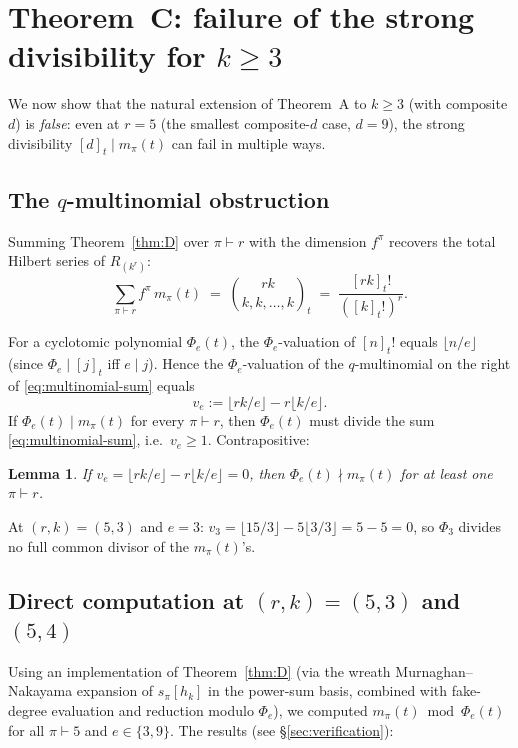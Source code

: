\documentclass[11pt]{article}
\newtheorem{lemma}[theorem]{Lemma}
\theoremstyle{plain}
\theoremstyle{definition}
\theoremstyle{remark}
\begin{document}
\section{Theorem~C: failure of the strong divisibility for $k \ge 3$}

We now show that the natural extension of Theorem~A to $k \ge 3$ (with
composite $d$) is \emph{false}: even at $r = 5$ (the smallest composite-$d$
case, $d = 9$), the strong divisibility $[d]_t \mid m_\pi(t)$ can fail in
multiple ways.

\subsection{The $q$-multinomial obstruction}

Summing Theorem~\ref{thm:D} over $\pi \vdash r$ with the dimension
$f^\pi$ recovers the total Hilbert series of $R_{(k^r)}$:
\begin{equation}\label{eq:multinomial-sum}
\sum_{\pi \vdash r} f^\pi\, m_\pi(t) \;=\; \binom{rk}{k, k, \ldots, k}_t \;=\; \frac{[rk]_t!}{([k]_t!)^r}.
\end{equation}

For a cyclotomic polynomial $\Phi_e(t)$, the $\Phi_e$-valuation of
$[n]_t!$ equals $\lfloor n/e\rfloor$ (since $\Phi_e \mid [j]_t$ iff $e \mid j$).
Hence the $\Phi_e$-valuation of the $q$-multinomial on the right of
\eqref{eq:multinomial-sum} equals
\[
v_e := \lfloor rk/e \rfloor - r \lfloor k/e \rfloor.
\]
If $\Phi_e(t) \mid m_\pi(t)$ for every $\pi \vdash r$, then
$\Phi_e(t)$ must divide the sum \eqref{eq:multinomial-sum}, i.e.\
$v_e \ge 1$.  Contrapositive:
\begin{lemma}\label{lem:multinomial-obstruction}
If $v_e = \lfloor rk/e \rfloor - r \lfloor k/e \rfloor = 0$, then
$\Phi_e(t) \nmid m_\pi(t)$ for at least one $\pi \vdash r$.
\end{lemma}

At $(r, k) = (5, 3)$ and $e = 3$: $v_3 = \lfloor 15/3 \rfloor - 5 \lfloor 3/3 \rfloor = 5 - 5 = 0$, so $\Phi_3$ divides no full common divisor of the $m_\pi(t)$'s.

\subsection{Direct computation at $(r, k) = (5, 3)$ and $(5, 4)$}

Using an implementation of Theorem~\ref{thm:D} (via the wreath
Murnaghan--Nakayama expansion of $s_\pi[h_k]$ in the power-sum basis,
combined with fake-degree evaluation and reduction modulo $\Phi_e$),
we computed $m_\pi(t) \bmod \Phi_e(t)$ for all $\pi \vdash 5$ and
$e \in \{3, 9\}$.  The results (see \S\ref{sec:verification}):
\end{document}
